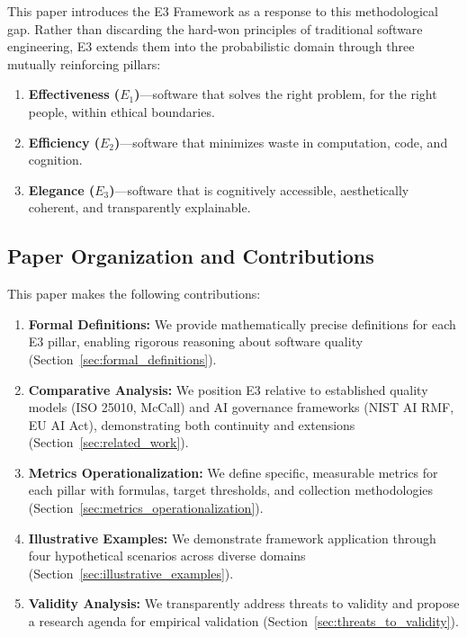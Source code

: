 \documentclass[11pt,a4paper]{article}
\begin{document}
This paper introduces the E3 Framework as a response to this methodological gap. Rather than discarding the hard-won principles of traditional software engineering, E3 extends them into the probabilistic domain through three mutually reinforcing pillars:

\begin{enumerate}[leftmargin=2em]
    \item \textbf{Effectiveness ($E_1$)}---software that solves the right problem, for the right people, within ethical boundaries.
    \item \textbf{Efficiency ($E_2$)}---software that minimizes waste in computation, code, and cognition.
    \item \textbf{Elegance ($E_3$)}---software that is cognitively accessible, aesthetically coherent, and transparently explainable.
\end{enumerate}

\subsection{Paper Organization and Contributions}

This paper makes the following contributions:

\begin{enumerate}[leftmargin=2em]
    \item \textbf{Formal Definitions:} We provide mathematically precise definitions for each E3 pillar, enabling rigorous reasoning about software quality (Section~\ref{sec:formal_definitions}).
    \item \textbf{Comparative Analysis:} We position E3 relative to established quality models (ISO 25010, McCall) and AI governance frameworks (NIST AI RMF, EU AI Act), demonstrating both continuity and extensions (Section~\ref{sec:related_work}).
    \item \textbf{Metrics Operationalization:} We define specific, measurable metrics for each pillar with formulas, target thresholds, and collection methodologies (Section~\ref{sec:metrics_operationalization}).
    \item \textbf{Illustrative Examples:} We demonstrate framework application through four hypothetical scenarios across diverse domains (Section~\ref{sec:illustrative_examples}).
    \item \textbf{Validity Analysis:} We transparently address threats to validity and propose a research agenda for empirical validation (Section~\ref{sec:threats_to_validity}).
\end{enumerate}
\end{document}
